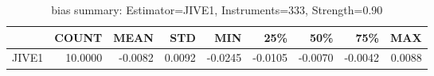 \begin{table}[ht]
\centering
\caption{bias summary: Estimator=JIVE1, Instruments=333, Strength=0.90}
\begin{tabular}{lrrrrrrrr}
\toprule
 & COUNT & MEAN & STD & MIN & 25\% & 50\% & 75\% & MAX \\
\midrule
JIVE1 & 10.0000 & -0.0082 & 0.0092 & -0.0245 & -0.0105 & -0.0070 & -0.0042 & 0.0088 \\
\bottomrule
\end{tabular}
\end{table}
